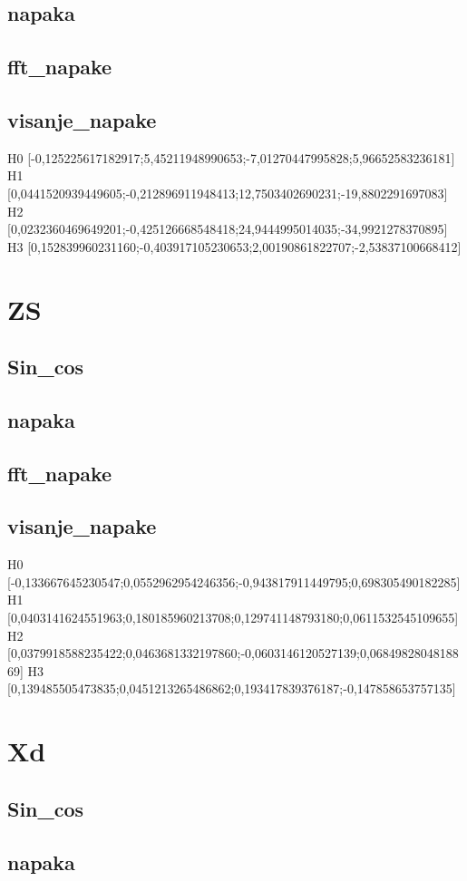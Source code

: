 \subsection{napaka}
\subsection{fft\_napake}
\subsection{visanje\_napake}
H0	[-0,125225617182917;5,45211948990653;-7,01270447995828;5,96652583236181]
H1	[0,0441520939449605;-0,212896911948413;12,7503402690231;-19,8802291697083]
H2	[0,0232360469649201;-0,425126668548418;24,9444995014035;-34,9921278370895]
H3	[0,152839960231160;-0,403917105230653;2,00190861822707;-2,53837100668412]
\section{ZS}
\subsection{Sin\_cos}
\subsection{napaka}
\subsection{fft\_napake}
\subsection{visanje\_napake}

H0	[-0,133667645230547;0,0552962954246356;-0,943817911449795;0,698305490182285]
H1	[0,0403141624551963;0,180185960213708;0,129741148793180;0,0611532545109655]
H2	[0,0379918588235422;0,0463681332197860;-0,0603146120527139;0,0684982804818869]
H3	[0,139485505473835;0,0451213265486862;0,193417839376187;-0,147858653757135]
\section{Xd}
\subsection{Sin\_cos}
\subsection{napaka}
